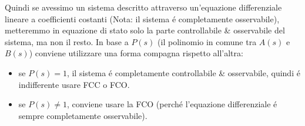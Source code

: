 \documentclass[../main.tex]{subfiles}
\begin{document}
\begin{itemize}
				Quindi se avessimo un sistema descritto attraverso un'equazione differenziale lineare a coefficienti costanti (Nota: il sistema \'e completamente osservabile), metteremmo in equazione di stato solo la parte controllabile \& osservabile del sistema, ma non il resto. In base a $ P(s) $ (il polinomio in comune tra $ A(s) $ e $ B(s) $) conviene utilizzare una forma compagna rispetto all'altra:
				\begin{itemize}
					\item 
						se $ P(s) = 1 $, il sistema \'e completamente controllabile \& osservabile, quindi \'e indifferente usare FCC o FCO.
					\item 
						se $ P(s) \neq 1 $, conviene usare la FCO (perch\'e l'equazione differenziale \'e sempre completamente osservabile).
				\end{itemize}
		\end{itemize}
\end{document}
